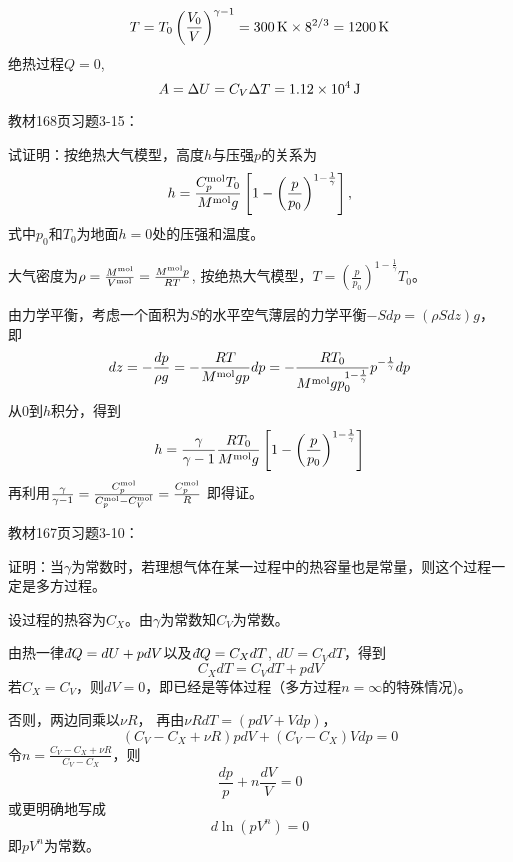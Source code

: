 \documentclass[CJK]{beamer}
\begin{document}
\begin{frame}
  \bch
  $$T=T_0\left(\frac{V_0}{V}\right)^{\gamma-1} = 300\,\mathrm{K}\times 8^{2/3} = 1200\,\mathrm{K} $$
  绝热过程$Q=0$,
  $$A = \Delta U =C_V\Delta T  = 1.12\times 10^4\,\mathrm{J}$$
  \ech
\end{frame}

\begin{frame}
  \chtitle{\proid (\sthree)}
  \bch
  教材168页习题3-15：

  试证明：按绝热大气模型，高度$h$与压强$p$的关系为
  $$ h = \frac{C_p^{\rm mol}T_0}{M^{\rm mol}g}\left[1-\left(\frac{p}{p_0}\right)^{1-\frac{1}{\gamma}}\right],$$
  式中$p_0$和$T_0$为地面$h=0$处的压强和温度。
  \ech
\end{frame}

\begin{frame}
  \bch
  {\small
    大气密度为$ \rho = \frac{M^{\rm mol}}{V^{\rm mol}} = \frac{M^{\rm mol}p}{RT} $,   按绝热大气模型，$T = \left(\frac{p}{p_0}\right)^{1-\frac{1}{\gamma}} T_0$。
    
  由力学平衡，考虑一个面积为$S$的水平空气薄层的力学平衡$-S dp = (\rho S dz)g $， 即
  $$ dz =-\frac{dp}{\rho g} = -\frac{RT }{M^{\rm mol}gp}dp= -\frac{RT_0}{M^{\rm mol}gp_0^{1-\frac{1}{\gamma}}} p^{-\frac{1}{\gamma}} dp$$
  从$0$到$h$积分，得到
  $$ h = \frac{\gamma}{\gamma-1}\frac{RT_0}{M^{\rm mol}g}\left[1-\left(\frac{p}{p_0}\right)^{1-\frac{1}{\gamma}}\right]$$
  再利用$\frac{\gamma}{\gamma-1} = \frac{C_p^{\rm mol}}{C_p^{\rm mol}-C_V^{\rm mol}} = \frac{C_p^{\rm mol}}{R}$
    即得证。
  }
  \ech
\end{frame}

\begin{frame}
  \chtitle{\proid (\stwo)}
  \bch
  教材167页习题3-10：

  证明：当$\gamma$为常数时，若理想气体在某一过程中的热容量也是常量，则这个过程一定是多方过程。
  \ech
\end{frame}


\begin{frame}
  \bch
  {\small
  设过程的热容为$C_X$。由$\gamma$为常数知$C_V$为常数。

  由热一律$\dbar Q = dU + pdV$以及$\dbar Q = C_X dT$, $dU = C_V dT$，得到
  $$ C_X dT = C_V dT + p dV$$
  若$C_X = C_V$，则$dV = 0$，即已经是等体过程（多方过程$n=\infty$的特殊情况)。
    
    否则，两边同乘以$\nu R$， 再由$\nu R dT =  (pdV + Vdp) $，
  $$ (C_V-C_X + \nu R) pdV + (C_V-C_X) Vdp = 0$$
  令$n =\frac{C_V-C_X + \nu R}{C_V-C_X }$，则
  $$ \frac{dp}{p} + n\frac{dV}{V} = 0$$
  或更明确地写成
  $$ d \ln (pV^n) = 0$$
  即$pV^n$为常数。
  }
  \ech
\end{frame}
\end{document}
